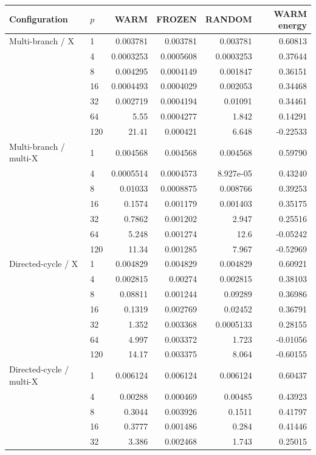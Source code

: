 \begin{longtable}{llrrrr}
\toprule
Configuration & $p$ & WARM & FROZEN & RANDOM & WARM energy \\
\midrule\endhead
Multi-branch / X & 1 & 0.003781 & 0.003781 & 0.003781 & 0.60813 \\
 & 4 & 0.0003253 & 0.0005608 & 0.0003253 & 0.37644 \\
 & 8 & 0.004295 & 0.0004149 & 0.001847 & 0.36151 \\
 & 16 & 0.0004493 & 0.0004029 & 0.002053 & 0.34468 \\
 & 32 & 0.002719 & 0.0004194 & 0.01091 & 0.34461 \\
 & 64 & 5.55 & 0.0004277 & 1.842 & 0.14291 \\
 & 120 & 21.41 & 0.000421 & 6.648 & -0.22533 \\
\midrule
Multi-branch / multi-X & 1 & 0.004568 & 0.004568 & 0.004568 & 0.59790 \\
 & 4 & 0.0005514 & 0.0004573 & 8.927e-05 & 0.43240 \\
 & 8 & 0.01033 & 0.0008875 & 0.008766 & 0.39253 \\
 & 16 & 0.1574 & 0.001179 & 0.001403 & 0.35175 \\
 & 32 & 0.7862 & 0.001202 & 2.947 & 0.25516 \\
 & 64 & 5.248 & 0.001274 & 12.6 & -0.05242 \\
 & 120 & 11.34 & 0.001285 & 7.967 & -0.52969 \\
\midrule
Directed-cycle / X & 1 & 0.004829 & 0.004829 & 0.004829 & 0.60921 \\
 & 4 & 0.002815 & 0.00274 & 0.002815 & 0.38103 \\
 & 8 & 0.08811 & 0.001244 & 0.09289 & 0.36986 \\
 & 16 & 0.1319 & 0.002769 & 0.02452 & 0.36791 \\
 & 32 & 1.352 & 0.003368 & 0.0005133 & 0.28155 \\
 & 64 & 4.997 & 0.003372 & 1.723 & -0.01056 \\
 & 120 & 14.17 & 0.003375 & 8.064 & -0.60155 \\
\midrule
Directed-cycle / multi-X & 1 & 0.006124 & 0.006124 & 0.006124 & 0.60437 \\
 & 4 & 0.00288 & 0.000469 & 0.00485 & 0.43923 \\
 & 8 & 0.3044 & 0.003926 & 0.1511 & 0.41797 \\
 & 16 & 0.3777 & 0.001486 & 0.284 & 0.41446 \\
 & 32 & 3.386 & 0.002468 & 1.743 & 0.25015 \\

\end{longtable}
